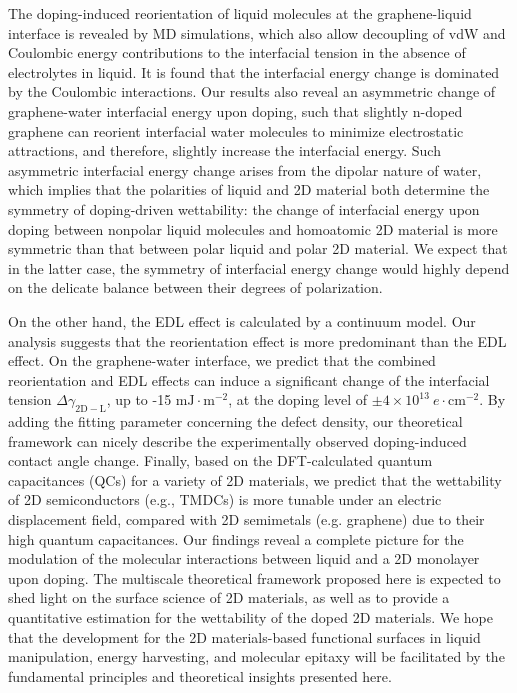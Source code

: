 The doping-induced reorientation of liquid molecules at the
graphene-liquid interface is revealed by MD simulations, which also
allow decoupling of vdW and Coulombic energy contributions to the
interfacial tension in the absence of electrolytes in liquid. It is
found that the interfacial energy change is dominated by the Coulombic
interactions. Our results also reveal an asymmetric change of
graphene-water interfacial energy upon doping, such that slightly
n-doped graphene can reorient interfacial water molecules to minimize
electrostatic attractions, and therefore, slightly increase the
interfacial energy. Such asymmetric interfacial energy change arises
from the dipolar nature of water, which implies that the polarities of
liquid and 2D material both determine the symmetry of
doping-driven wettability: the change of interfacial energy upon
doping between nonpolar liquid molecules and homoatomic 2D material is
more symmetric than that between polar liquid and polar 2D
material. We expect that in the latter case, the symmetry of
interfacial energy change would highly depend on the delicate balance
between their degrees of polarization.

On the other hand, the EDL effect is calculated by a continuum model. Our
analysis suggests that the reorientation effect is more predominant
than the EDL effect. On the graphene-water interface, we predict that
the combined reorientation and EDL effects can induce a significant
change of the interfacial tension \(\Delta
\gamma_{\mathrm{2D-L}}\), up to -15 \(\mathrm{mJ}\cdot
\mathrm{m}^{-2}\), at the doping level of \(\pm 4 \times 10^{13}\ e\cdot
\mathrm{cm}^{-2}\). By adding the fitting parameter concerning the
defect density, our theoretical framework can nicely describe the
experimentally observed doping-induced contact angle change. Finally,
based on the DFT-calculated quantum capacitances (QCs) for a variety
of 2D materials, we predict that the wettability of 2D semiconductors
(e.g., TMDCs) is more tunable under an electric displacement field,
compared with 2D semimetals (e.g. graphene) due to their high quantum
capacitances. Our findings reveal a complete picture for the
modulation of the molecular interactions between liquid and a 2D monolayer upon
doping. The multiscale theoretical
framework proposed here is expected to shed
light on the surface science of 2D materials, 
as well as to provide a quantitative estimation for the wettability
of the doped 2D materials. We hope that the development for the 2D
materials-based functional surfaces in liquid manipulation, energy
harvesting, and molecular epitaxy will be facilitated by the
fundamental principles and theoretical insights presented here.


